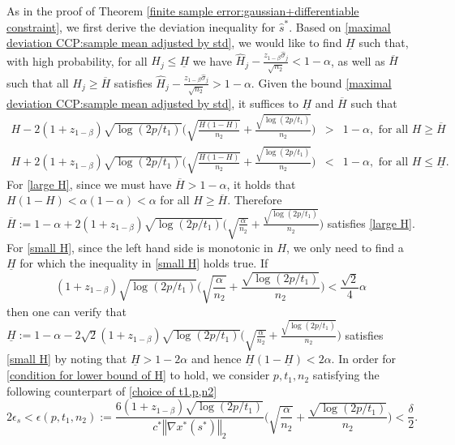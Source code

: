 \documentclass[mnsc,blindrev]{informs4} %
\newcommand{\norm}[1]{\left \Vert #1 \right\Vert}
\begin{document}
As in the proof of Theorem \ref{finite sample error:gaussian+differentiable constraint}, we first derive the deviation inequality for $\hat s^*$. Based on \eqref{maximal deviation CCP:sample mean adjusted by std}, we would like to find $\underline{H}$ such that, with high probability, for all $H_j\leq \underline{H}$ we have $\hat H_j-\frac{z_{1-\beta}\hat\sigma_j}{\sqrt{n_2}}<1-\alpha$, as well as $\overline{H}$ such that all $H_j\geq \overline{H}$ satisfies $\hat H_j-\frac{z_{1-\beta}\hat\sigma_j}{\sqrt{n_2}}>1-\alpha$. Given the bound \eqref{maximal deviation CCP:sample mean adjusted by std}, it suffices to $\underline{H}$ and $\overline{H}$ such that
\begin{eqnarray}
    H-2(1+z_{1-\beta})\sqrt{\log (2p/t_1)}\big(\sqrt{\frac{H(1-H)}{n_2}}+\frac{\sqrt{\log (2p/t_1)}}{n_2}\big)&>&1-\alpha,\text{ for all }H\geq \overline{H}\label{large H}\\
    H+2(1+z_{1-\beta})\sqrt{\log (2p/t_1)}\big(\sqrt{\frac{H(1-H)}{n_2}}+\frac{\sqrt{\log (2p/t_1)}}{n_2}\big)&<&1-\alpha,\text{ for all }H\leq \underline{H}.\label{small H}
\end{eqnarray}
For \eqref{large H}, since we must have $\overline{H}>1-\alpha$, it holds that $H(1-H)< \alpha(1-\alpha)<\alpha$ for all $H\geq \overline{H}$. Therefore $\overline{H}:=1-\alpha+2(1+z_{1-\beta})\sqrt{\log (2p/t_1)}\big(\sqrt{\frac{\alpha}{n_2}}+\frac{\sqrt{\log (2p/t_1)}}{n_2}\big)$ satisfies \eqref{large H}. For \eqref{small H}, since the left hand side is monotonic in $H$, we only need to find a $\underline{H}$ for which the inequality in \eqref{small H} holds true. If
\begin{equation}\label{condition for lower bound of H}
(1+z_{1-\beta})\sqrt{\log (2p/t_1)}\big(\sqrt{\frac{\alpha}{n_2}}+\frac{\sqrt{\log (2p/t_1)}}{n_2}\big)<\frac{\sqrt{2}}{4}\alpha
\end{equation}
then one can verify that $\underline{H}:=1-\alpha-2\sqrt{2}(1+z_{1-\beta})\sqrt{\log (2p/t_1)}\big(\sqrt{\frac{\alpha}{n_2}}+\frac{\sqrt{\log (2p/t_1)}}{n_2}\big)$ satisfies \eqref{small H} by noting that $\underline{H}>1-2\alpha$ and hence $\underline{H}(1-\underline{H})< 2\alpha$. In order for \eqref{condition for lower bound of H} to hold, we consider $p,t_1,n_2$ satisfying the following counterpart of \eqref{choice of t1,p,n2}
\begin{equation}\label{choice of p,t1,n2 CCP}
    2\epsilon_s<\epsilon(p,t_1,n_2):=\frac{6(1+z_{1-\beta})\sqrt{\log (2p/t_1)}}{c^*\norm{\nabla x^*(s^*)}_2}\big(\sqrt{\frac{\alpha}{n_2}}+\frac{\sqrt{\log (2p/t_1)}}{n_2}\big)< \frac{\delta}{2}.
\end{equation}
\end{document}
